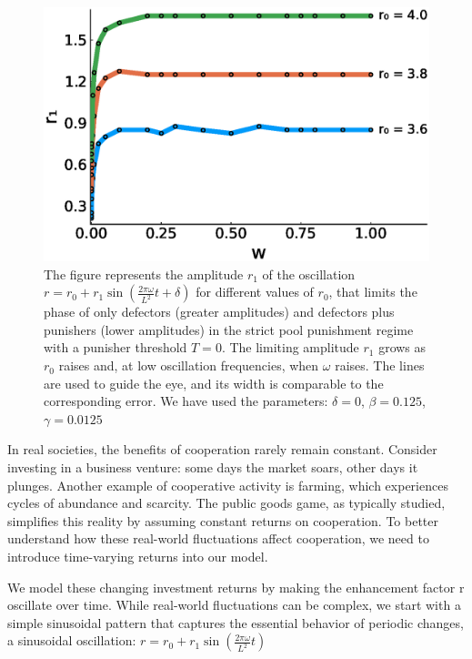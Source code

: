 \begin{figure}
	\centering
	\includegraphics[width=1\linewidth]{Images/P2/grafica_r1_w0_T0_Pool.eps}
	\caption{The figure represents the amplitude $r_1$ of the oscillation $r=r_0+r_1\sin(\frac{2\pi\omega}{L^2}t+\delta)$ for different values of $r_0$, that limits the phase of only defectors (greater amplitudes) and defectors plus punishers (lower amplitudes) in the strict pool punishment regime with a punisher threshold $T=0$. The limiting amplitude $r_1$ grows as $r_0$ raises and, at low oscillation frequencies, when $\omega$ raises. The lines are used to guide the eye, and its width is comparable to the corresponding error. We have used the parameters: $\delta=0$, $\beta=0.125$, $\gamma=0.0125$}
	\label{r1_w0}
\end{figure}





In real societies, the benefits of cooperation rarely remain constant. Consider investing in a business venture: some days the market soars, other days it plunges. Another example of cooperative activity is farming, which experiences cycles of abundance and scarcity. The public goods game, as typically studied, simplifies this reality by assuming constant returns on cooperation. To better understand how these real-world fluctuations affect cooperation, we need to introduce time-varying returns into our model.

We model these changing investment returns by making the enhancement factor r oscillate over time. While real-world fluctuations can be complex, we start with a simple sinusoidal pattern that captures the essential behavior of periodic changes, a sinusoidal oscillation: $r=r_0+r_1\sin(\frac{2\pi\omega}{L^2}t)$

